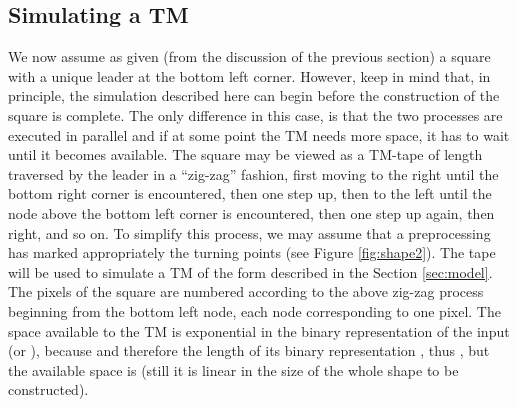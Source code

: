 \documentclass[oribibl, 11pt]{llncs}
\begin{document}
\subsection{Simulating a TM}
\label{subsec:simulation}

We now assume as given (from the discussion of the previous section) a  square with a unique leader  at the bottom left corner. However, keep in mind that, in principle, the simulation described here can begin before the construction of the  square is complete. The only difference in this case, is that the two processes are executed in parallel and if at some point the TM needs more space, it has to wait until it becomes available. The square may be viewed as a TM-tape of length  traversed by the leader in a ``zig-zag'' fashion, first moving to the right until the bottom right corner is encountered, then one step up, then to the left until the node above the bottom left corner is encountered, then one step up again, then right, and so on. To simplify this process, we may assume that a preprocessing has marked appropriately the turning points (see Figure \ref{fig:shape2}). The tape will be used to simulate a TM  of the form described in the Section \ref{sec:model}. The  pixels of the square are numbered according to the above zig-zag process beginning from the bottom left node, each node corresponding to one pixel. The space available to the TM is exponential in the binary representation of the input  (or ), because  and therefore the length of its binary representation , thus , but the available space is  (still it is linear in the size of the whole shape to be constructed).
\end{document}
